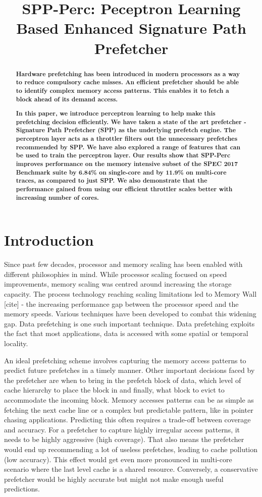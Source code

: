 \documentclass{sig-alternate}
\title{SPP-Perc: Peceptron Learning Based Enhanced Signature Path Prefetcher}
\author{}
\begin{document}
\maketitle
\thispagestyle{firstpage}
\pagestyle{plain}

\begin{abstract}
\textbf{Hardware prefetching has been introduced in modern processors as a way to reduce compulsory cache misses. 
An efficient prefetcher should be able to identify complex memory access patterns. 
This enables it to fetch a block ahead of its demand access. 
}

\textbf{In this paper, we introduce perceptron learning to help make this prefetching decision efficiently. 
We have taken a state of the art prefetcher - Signature Path Prefetcher (SPP) as the underlying prefetch engine. 
The perceptron layer acts as a throttler filters out the unnecessary prefetches recommended by SPP. 
We have also explored a range of features that can be used to train the perceptron layer. 
Our results show that SPP-Perc improves performance on the memory intensive subset of the SPEC 2017 Benchmark suite by 6.84\% on single-core and by 11.9\% on multi-core traces, as compared to just SPP.
We also demonstrate that the performance gained from using our efficient throttler scales better with increasing number of cores.
}
\end{abstract}

\section{Introduction}
Since past few decades, processor and memory scaling has been enabled with different philosophies in mind. 
While processor scaling focused on speed improvements, memory scaling was centred around increasing the storage capacity. 
The process technology reaching scaling limitations led to Memory Wall [cite] - the increasing performance gap between the processor speed and the memory speeds. 
Various techniques have been developed to combat this widening gap. 
Data prefetching is one such important technique. 
Data prefetching exploits the fact that most applications, data is accessed with some spatial or temporal locality.

An ideal prefetching scheme involves capturing the memory access patterns to predict future prefetches in a timely manner. 
Other important decisions faced by the prefetcher are when to bring in the prefetch block of data, which level of cache hierarchy to place the block in and finally, what block to evict to accommodate the incoming block. 
Memory accesses patterns can be as simple as fetching the next cache line or a complex but predictable pattern, like in pointer chasing applications. 
Predicting this often requires a trade-off between coverage and accuracy. 
For a prefetcher to capture highly irregular access patterns, it needs to be highly aggressive (high coverage). 
That also means the prefetcher would end up recommending a lot of useless prefetches, leading to cache pollution (low accuracy). 
This effect would get even more pronounced in multi-core scenario where the last level cache is a shared resource. 
Conversely, a conservative prefetcher would be highly accurate but might not make enough useful predictions.
\end{document}
